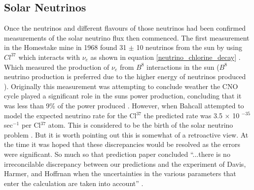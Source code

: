 \subsection{Solar Neutrinos}
Once the neutrinos and different flavours of those neutrinos had been confirmed \cite{DanbyG1962PhysRevLett.9.36} measurements of the solar neutrino flux then commenced. The first measurement in the Homestake mine in 1968 found 31 $\pm$ 10 neutrinos from the sun \cite{davis1968homestake} by using $Cl^{37}$ which interacts with $\nu_e$ as shown in equation \ref{neutrino_chlorine_decay} \cite{Bellerive:2003rj}. Which measured the production of $\nu_e$ from $B^8$ interactions in the sun ($B^8$ neutrino production is preferred due to the higher energy of neutrinos produced \cite{griffiths2008neutrinoOscillations}). Originally this measurement was attempting to conclude weather the CNO cycle played a significant role in the suns power production, concluding that it was less than 9\% of the power produced \cite{davis1968homestake}. However, when Bahcall attempted to model the expected neutrino rate for the Cl$^{37}$ the predicted rate was 3.5 $\times$ 10 $^{-35}$ sec$^{-1}$ per Cl$^{37}$ atom. This is considered to be the birth of the solar neutrino problem \cite{griffiths2008neutrinoOscillations}. But it is worth pointing out this is somewhat of a retroactive view. At the time it was hoped that these discrepancies would be resolved as the errors were significant. So much so that prediction paper concluded ``...there is no irreconcilable discrepancy between our predictions and the experiment of Davis, Harmer, and Hoffrnan when the uncertainties in the various parameters that enter the calculation are taken into account'' \cite{bahcall1968present}.
